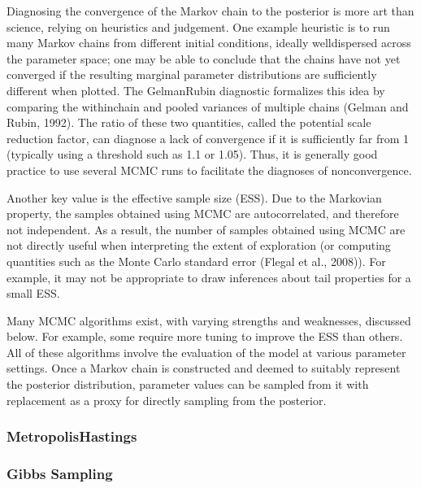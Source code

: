\documentclass[letterpaper,10pt,english]{sphinxmanual}
\begin{document}
\sphinxAtStartPar
Diagnosing the convergence of the Markov chain to the posterior is more art than science, relying on heuristics and judgement. One example heuristic is to run many Markov chains from different initial conditions, ideally well\sphinxhyphen{}dispersed across the parameter space; one may be able to conclude that the chains have not yet converged if the resulting marginal parameter distributions are sufficiently different when plotted. The Gelman\sphinxhyphen{}Rubin diagnostic formalizes this idea by comparing the within\sphinxhyphen{}chain and pooled variances of multiple chains (Gelman and Rubin, 1992). The ratio of these two quantities, called the potential scale reduction factor, can diagnose a lack of convergence if it is sufficiently far from 1 (typically using a threshold such as 1.1 or 1.05). Thus, it is generally good practice to use several MCMC runs to facilitate the diagnoses of non\sphinxhyphen{}convergence.

\sphinxAtStartPar
Another key value is the effective sample size (ESS). Due to the Markovian property, the samples obtained using MCMC are autocorrelated, and therefore not independent. As a result, the number of samples obtained using MCMC are not directly useful when interpreting the extent of exploration (or computing quantities such as the Monte Carlo standard error (Flegal et al., 2008)). For example, it may not be appropriate to draw inferences about tail properties for a small  ESS.

\sphinxAtStartPar
Many MCMC algorithms exist, with varying strengths and weaknesses, discussed below. For example, some require more tuning to improve the ESS than others. All of these algorithms involve the evaluation of the model at various parameter settings. Once a Markov chain is constructed and deemed to suitably represent the posterior distribution, parameter values can be sampled from it with replacement as a proxy for directly sampling from the posterior.


\subsubsection{Metropolis\sphinxhyphen{}Hastings}
\label{\detokenize{6_uncertainty_quantification_a_tool_for_capturing_risks_and_extremes:metropolis-hastings}}

\subsubsection{Gibbs Sampling}
\label{\detokenize{6_uncertainty_quantification_a_tool_for_capturing_risks_and_extremes:gibbs-sampling}}
\end{document}
